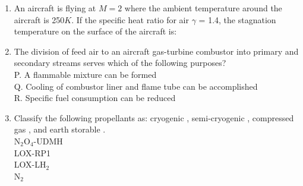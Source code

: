 \documentclass[journal,12pt,onecolumn]{IEEEtran}
\theoremstyle{remark}
\begin{document}
\begin{enumerate}
\begin{enumerate}
\end{enumerate}
\item An aircraft is flying at $M = 2$ where the ambient temperature around the aircraft is 250$K$. If the specific heat ratio for air $\gamma$ = 1.4, the stagnation temperature on the surface of the aircraft is:
\begin{enumerate}
\end{enumerate}
\item The division of feed air to an aircraft gas-turbine combustor into primary and secondary streams serves which of the following purposes?\\
P. A flammable mixture can be formed\\
Q. Cooling of combustor liner and flame tube can be accomplished\\
R. Specific fuel consumption can be reduced
\begin{enumerate}
\end{enumerate}
\item Classify the following propellants as: cryogenic , semi-cryogenic , compressed gas , and earth storable .\\
N$_2$O$_4$-UDMH \\
LOX-RP1 \\
LOX-LH$_2$ \\
N$_2$ \\

\end{enumerate}
\end{document}

